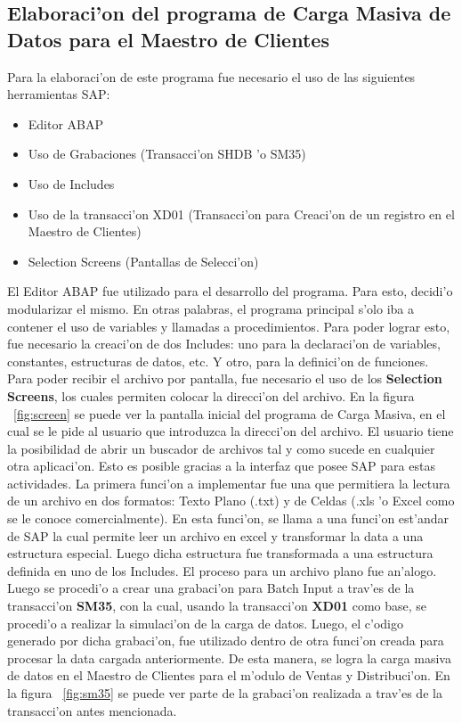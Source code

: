 \subsection{Elaboraci'on del programa de Carga Masiva de Datos para el Maestro de Clientes}
	Para la elaboraci'on de este programa fue necesario el uso de las siguientes herramientas SAP:
\begin{itemize}
\item Editor ABAP
\item Uso de Grabaciones (Transacci'on SHDB 'o SM35)
\item Uso de Includes
\item Uso de la transacci'on XD01 (Transacci'on para Creaci'on de un registro en el Maestro de Clientes)
\item Selection Screens (Pantallas de Selecci'on)
\end{itemize}
	El Editor ABAP fue utilizado para el desarrollo del programa. Para esto, decidi'o modularizar el mismo. En otras palabras, el programa principal s'olo iba a contener el uso de variables y llamadas a procedimientos. 
\newline
\newline
\indent Para poder lograr esto, fue necesario la creaci'on de dos Includes: uno para la declaraci'on de variables, constantes, estructuras de datos, etc. Y otro, para la definici'on de funciones.
\newline
\newline
\indent Para poder recibir el archivo por pantalla, fue necesario el uso de los \textbf{Selection Screens}, los cuales permiten colocar la direcci'on del archivo. En la figura ~\ref{fig:screen} se puede ver la pantalla inicial del programa de Carga Masiva, en el cual se le pide al usuario que introduzca la direcci'on del archivo. El usuario tiene la posibilidad de abrir un buscador de archivos tal y como sucede en cualquier otra aplicaci'on. Esto es posible gracias a la interfaz que posee SAP para estas actividades.
\newline
\newline
\indent La primera funci'on a implementar fue una que permitiera la lectura de un archivo en dos formatos: Texto Plano (.txt) y de Celdas (.xls 'o Excel como se le conoce comercialmente). En esta funci'on, se llama a una funci'on est'andar de SAP la cual permite leer un archivo en excel y transformar la data a una estructura especial. Luego dicha estructura fue transformada a una estructura definida en uno de los Includes. El proceso para un archivo plano fue an'alogo.
\newline
\newline
\indent Luego se procedi'o a crear una grabaci'on para Batch Input a trav'es de la transacci'on \textbf{SM35}, con la cual, usando la transacci'on \textbf{XD01} como base, se procedi'o a realizar la simulaci'on de la carga de datos. Luego, el c'odigo generado por dicha grabaci'on, fue utilizado dentro de otra funci'on creada para procesar la data cargada anteriormente. De esta manera, se logra la carga masiva de datos en el Maestro de Clientes para el m'odulo de Ventas y Distribuci'on. En la figura ~\ref{fig:sm35} se puede ver parte de la grabaci'on realizada a trav'es de la transacci'on antes mencionada.


